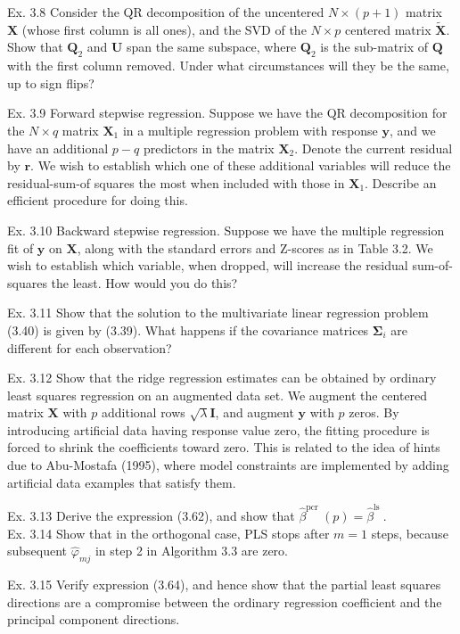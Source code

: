 \documentclass[10pt]{article}
\begin{document}
Ex. 3.8 Consider the QR decomposition of the uncentered $N \times(p+1)$ matrix $\mathbf{X}$ (whose first column is all ones), and the SVD of the $N \times p$ centered matrix $\tilde{\mathbf{X}}$. Show that $\mathbf{Q}_{2}$ and $\mathbf{U}$ span the same subspace, where $\mathbf{Q}_{2}$ is the sub-matrix of $\mathbf{Q}$ with the first column removed. Under what circumstances will they be the same, up to sign flips?

Ex. 3.9 Forward stepwise regression. Suppose we have the QR decomposition for the $N \times q$ matrix $\mathbf{X}_{1}$ in a multiple regression problem with response $\mathbf{y}$, and we have an additional $p-q$ predictors in the matrix $\mathbf{X}_{2}$. Denote the current residual by $\mathbf{r}$. We wish to establish which one of these additional variables will reduce the residual-sum-of squares the most when included with those in $\mathbf{X}_{1}$. Describe an efficient procedure for doing this.

Ex. 3.10 Backward stepwise regression. Suppose we have the multiple regression fit of $\mathbf{y}$ on $\mathbf{X}$, along with the standard errors and Z-scores as in Table 3.2. We wish to establish which variable, when dropped, will increase the residual sum-of-squares the least. How would you do this?

Ex. 3.11 Show that the solution to the multivariate linear regression problem (3.40) is given by (3.39). What happens if the covariance matrices $\boldsymbol{\Sigma}_{i}$ are different for each observation?

Ex. 3.12 Show that the ridge regression estimates can be obtained by ordinary least squares regression on an augmented data set. We augment the centered matrix $\mathbf{X}$ with $p$ additional rows $\sqrt{\lambda} \mathbf{I}$, and augment $\mathbf{y}$ with $p$ zeros. By introducing artificial data having response value zero, the fitting procedure is forced to shrink the coefficients toward zero. This is related to the idea of hints due to Abu-Mostafa (1995), where model constraints are implemented by adding artificial data examples that satisfy them.

Ex. 3.13 Derive the expression (3.62), and show that $\hat{\beta}^{\text {pcr }}(p)=\hat{\beta}^{\text {ls }}$.\\
Ex. 3.14 Show that in the orthogonal case, PLS stops after $m=1$ steps, because subsequent $\hat{\varphi}_{m j}$ in step 2 in Algorithm 3.3 are zero.

Ex. 3.15 Verify expression (3.64), and hence show that the partial least squares directions are a compromise between the ordinary regression coefficient and the principal component directions.
\end{document}
